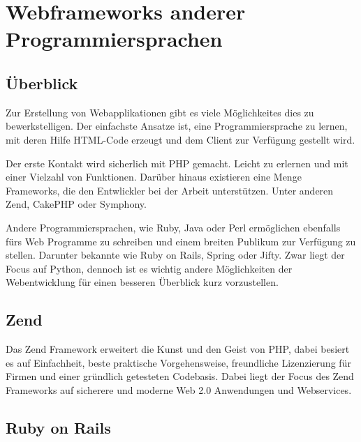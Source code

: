 \section{Webframeworks anderer Programmiersprachen}
\subsection{Überblick}
Zur Erstellung von Webapplikationen gibt es viele Möglichkeites dies zu
bewerkstelligen. Der einfachste Ansatze ist, eine Programmiersprache zu lernen,
mit deren Hilfe HTML-Code erzeugt und dem Client zur Verfügung gestellt
wird.

Der erste Kontakt wird sicherlich mit PHP gemacht. Leicht zu erlernen und
mit einer Vielzahl von Funktionen. Darüber hinaus existieren eine Menge
Frameworks, die den Entwlickler bei der Arbeit unterstützen. Unter anderen Zend,
CakePHP oder Symphony.

Andere Programmiersprachen, wie Ruby, Java oder Perl ermöglichen ebenfalls fürs
Web Programme zu schreiben und einem breiten Publikum zur Verfügung zu stellen.
Darunter bekannte wie Ruby on Rails, Spring oder Jifty. Zwar liegt der Focus
auf Python, dennoch ist es wichtig andere Möglichkeiten der Webentwicklung für
einen besseren Überblick kurz vorzustellen.

\subsection{Zend}
Das Zend Framework erweitert die Kunst und den Geist von PHP, dabei besiert es
auf Einfachheit, beste praktische Vorgehensweise, freundliche Lizenzierung für
Firmen und einer gründlich getesteten Codebasis. Dabei liegt der Focus des Zend
Frameworks auf sicherere und moderne Web 2.0 Anwendungen und Webservices.
\cite{zend}

\subsection{Ruby on Rails}






